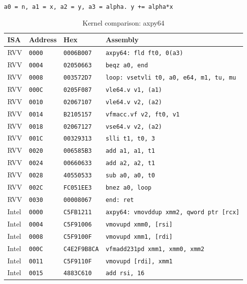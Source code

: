 \begin{table}[htbp]
\centering
\caption{Kernel comparison: axpy64}
\begingroup
\scriptsize
\setlength{\tabcolsep}{4pt}
\noindent \texttt{a0 = n, a1 = x, a2 = y, a3 = alpha. y += alpha*x}\par
\vspace{0.6ex}
\begin{tabular}{@{}l|l|l|p{7.2cm}@{}}
\toprule
ISA & Address & Hex & Assembly \\
\midrule
RVV & \texttt{0000} & \texttt{0006B007} & \texttt{axpy64: fld ft0, 0(a3)} \\
RVV & \texttt{0004} & \texttt{02050663} & \texttt{beqz a0, end} \\
RVV & \texttt{0008} & \texttt{003572D7} & \texttt{loop: vsetvli t0, a0, e64, m1, tu, mu} \\
RVV & \texttt{000C} & \texttt{0205F087} & \texttt{vle64.v v1, (a1)} \\
RVV & \texttt{0010} & \texttt{02067107} & \texttt{vle64.v v2, (a2)} \\
RVV & \texttt{0014} & \texttt{B2105157} & \texttt{vfmacc.vf v2, ft0, v1} \\
RVV & \texttt{0018} & \texttt{02067127} & \texttt{vse64.v v2, (a2)} \\
RVV & \texttt{001C} & \texttt{00329313} & \texttt{slli t1, t0, 3} \\
RVV & \texttt{0020} & \texttt{006585B3} & \texttt{add a1, a1, t1} \\
RVV & \texttt{0024} & \texttt{00660633} & \texttt{add a2, a2, t1} \\
RVV & \texttt{0028} & \texttt{40550533} & \texttt{sub a0, a0, t0} \\
RVV & \texttt{002C} & \texttt{FC051EE3} & \texttt{bnez a0, loop} \\
RVV & \texttt{0030} & \texttt{00008067} & \texttt{end: ret} \\
\midrule
Intel & \texttt{0000} & \texttt{C5FB1211} & \texttt{axpy64: vmovddup xmm2, qword ptr [rcx]} \\
Intel & \texttt{0004} & \texttt{C5F91006} & \texttt{vmovupd xmm0, [rsi]} \\
Intel & \texttt{0008} & \texttt{C5F9100F} & \texttt{vmovupd xmm1, [rdi]} \\
Intel & \texttt{000C} & \texttt{C4E2F9B8CA} & \texttt{vfmadd231pd xmm1, xmm0, xmm2} \\
Intel & \texttt{0011} & \texttt{C5F9110F} & \texttt{vmovupd [rdi], xmm1} \\
Intel & \texttt{0015} & \texttt{4883C610} & \texttt{add rsi, 16} \\

\end{tabular}
\end{table}
